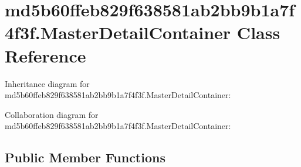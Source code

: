 \hypertarget{classmd5b60ffeb829f638581ab2bb9b1a7f4f3f_1_1_master_detail_container}{}\section{md5b60ffeb829f638581ab2bb9b1a7f4f3f.\+Master\+Detail\+Container Class Reference}
\label{classmd5b60ffeb829f638581ab2bb9b1a7f4f3f_1_1_master_detail_container}


Inheritance diagram for md5b60ffeb829f638581ab2bb9b1a7f4f3f.\+Master\+Detail\+Container\+:


Collaboration diagram for md5b60ffeb829f638581ab2bb9b1a7f4f3f.\+Master\+Detail\+Container\+:
\subsection*{Public Member Functions}
